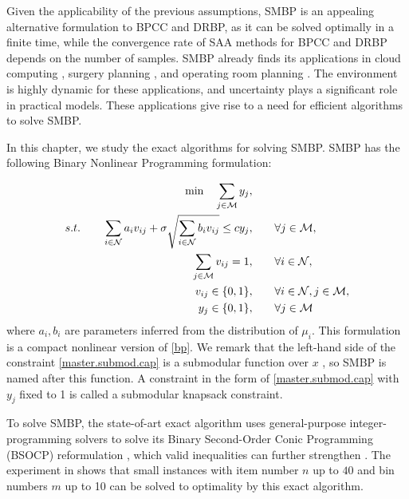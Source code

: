  Given the applicability of the previous assumptions, SMBP is an appealing alternative formulation to BPCC and DRBP, as it can be solved optimally in a finite time, while  the convergence rate of  SAA methods for BPCC and DRBP depends on the number of samples.  SMBP already finds its applications in  cloud computing \citep{cohen2019overcommitment}, surgery planning \citep{deng2019chance}, and operating room planning \citep{wang2021chance}. The environment is highly dynamic for these applications, and uncertainty plays a significant role in practical models. These applications give rise to a need for efficient algorithms to solve SMBP.

 In this chapter, we study the exact algorithms for solving SMBP. SMBP has the following Binary Nonlinear Programming formulation:

 \begin{subequations}
 \label{master.submod}
 \begin{align}
 \min \quad \sum_{j \in \mathcal M} {y}_{{j}}, \qquad&\\
 s.t. \qquad \sum_{i \in \mathcal N} a_i v_{ij} + \sigma\sqrt{\sum_{i \in \mathcal N} b_i v_{ij} } \le c {y}_{{j}}, \qquad& \forall j \in \mathcal M, \label{master.submod.cap} \\
  \sum_{j \in \mathcal M} v_{ij} = 1, \qquad& \forall i \in \mathcal N, \label{master.submod.cover} \\
  v_{ij} \in \{0,1\}, \qquad& \forall i \in \mathcal N, j \in \mathcal M, \label{master.submod.x}\\
  y_{j} \in \{0,1\}, \qquad& \forall j \in \mathcal M \label{master.submod.y}
 \end{align}
 \end{subequations}
where $a_i,b_i$ are parameters inferred from the distribution of $\mu_i$. This formulation is a compact nonlinear version of \eqref{bp}. We remark that the left-hand side of the constraint \eqref{master.submod.cap} is a submodular function over $x$ \citep{atamturk2008polymatroids}, so SMBP is named after this function. A constraint in the form of \eqref{master.submod.cap} with $y_j$ fixed to 1 is called a submodular knapsack constraint.


To solve SMBP, the state-of-art exact algorithm uses general-purpose integer-programming solvers to solve its Binary Second-Order Conic Programming (BSOCP) reformulation \citep{zhang2018ambiguous}, which valid inequalities can further strengthen \cite{atamturk2008polymatroids}. The experiment  in \cite{zhang2018ambiguous} shows that small instances with item number $n$ up to $40$ and bin numbers $m$ up to 10  can be solved to optimality by this exact algorithm.

